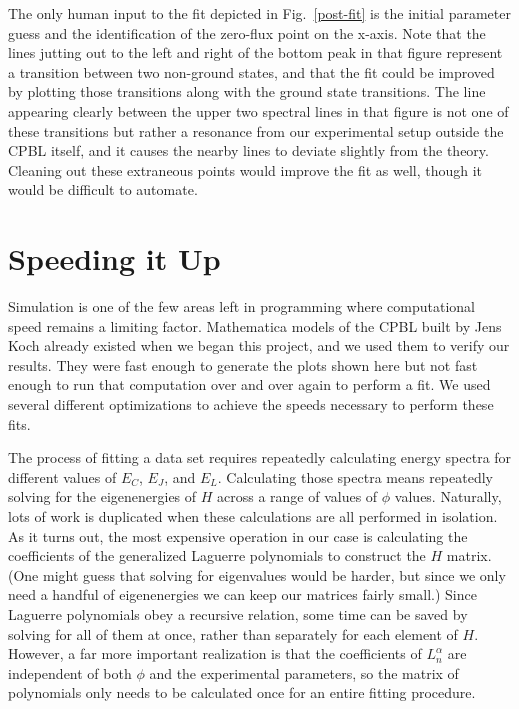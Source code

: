 \documentclass[twocolumn]{revtex4}
\begin{document}
The only human input to the fit depicted in Fig.~\ref{post-fit} is the
initial parameter guess and the identification of the zero-flux point
on the x-axis. Note that the lines jutting out to the left and right
of the bottom peak in that figure represent a transition between two
non-ground states, and that the fit could be improved by plotting
those transitions along with the ground state transitions. The line
appearing clearly between the upper two spectral lines in that figure
is not one of these transitions but rather a resonance from our
experimental setup outside the CPBL itself, and it causes the nearby
lines to deviate slightly from the theory. Cleaning out these
extraneous points would improve the fit as well, though it would
be difficult to automate.

\section{Speeding it Up}

Simulation is one of the few areas left in programming where
computational speed remains a limiting factor. Mathematica models of
the CPBL built by Jens Koch already existed when we began this
project, and we used them to verify our results. They were fast enough
to generate the plots shown here but not fast enough to run that
computation over and over again to perform a fit. We used several
different optimizations to achieve the speeds necessary to perform
these fits.

The process of fitting a data set requires repeatedly calculating
energy spectra for different values of $E_C$, $E_J$, and
$E_L$. Calculating those spectra means repeatedly solving for the
eigenenergies of $H$ across a range of values of $\phi$
values. Naturally, lots of work is duplicated when these calculations
are all performed in isolation. As it turns out, the most expensive
operation in our case is calculating the coefficients of the
generalized Laguerre polynomials to construct the $H$ matrix. (One
might guess that solving for eigenvalues would be harder, but since we
only need a handful of eigenenergies we can keep our matrices fairly
small.) Since Laguerre polynomials obey a recursive relation, some
time can be saved by solving for all of them at once, rather than
separately for each element of $H$. However, a far more important
realization is that the coefficients of $L_n^\alpha$ are independent
of both $\phi$ and the experimental parameters, so the matrix of
polynomials only needs to be calculated once for an entire fitting
procedure.
\end{document}
